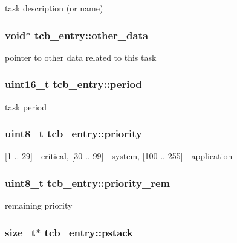 task description (or name) \hypertarget{structtcb__entry_accd675f017bb0ec5ae63b4d729bd73aa}{
\subsubsection[{other\-\_\-data}]{\setlength{\rightskip}{0pt plus 5cm}void$\ast$ tcb\-\_\-entry\-::other\-\_\-data}}\label{structtcb__entry_accd675f017bb0ec5ae63b4d729bd73aa}
pointer to other data related to this task \hypertarget{structtcb__entry_a85e14b4c040e0535b45b52a7ee7c9a94}{
\subsubsection[{period}]{\setlength{\rightskip}{0pt plus 5cm}uint16\-\_\-t tcb\-\_\-entry\-::period}}\label{structtcb__entry_a85e14b4c040e0535b45b52a7ee7c9a94}
task period \hypertarget{structtcb__entry_a5a925d67b6f5391815abcbd2c251c77d}{
\subsubsection[{priority}]{\setlength{\rightskip}{0pt plus 5cm}uint8\-\_\-t tcb\-\_\-entry\-::priority}}\label{structtcb__entry_a5a925d67b6f5391815abcbd2c251c77d}
\mbox{[}1 .. 29\mbox{]} -\/ critical, \mbox{[}30 .. 99\mbox{]} -\/ system, \mbox{[}100 .. 255\mbox{]} -\/ application \hypertarget{structtcb__entry_a63888ca7a7a923f912bf3a404d1261ca}{
\subsubsection[{priority\-\_\-rem}]{\setlength{\rightskip}{0pt plus 5cm}uint8\-\_\-t tcb\-\_\-entry\-::priority\-\_\-rem}}\label{structtcb__entry_a63888ca7a7a923f912bf3a404d1261ca}
remaining priority \hypertarget{structtcb__entry_a48bcced7fc892ae8db7138786e38a898}{
\subsubsection[{pstack}]{\setlength{\rightskip}{0pt plus 5cm}size\-\_\-t$\ast$ tcb\-\_\-entry\-::pstack}}\label{structtcb__entry_a48bcced7fc892ae8db7138786e38a898}
